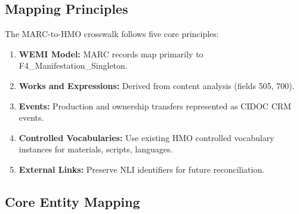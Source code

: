 \documentclass[12pt]{article}
\begin{document}
\subsection{Mapping Principles}

The MARC-to-HMO crosswalk follows five core principles:

\begin{enumerate}
\item \textbf{WEMI Model:} MARC records map primarily to F4\_Manifestation\_Singleton.
\item \textbf{Works and Expressions:} Derived from content analysis (fields 505, 700).
\item \textbf{Events:} Production and ownership transfers represented as CIDOC CRM events.
\item \textbf{Controlled Vocabularies:} Use existing HMO controlled vocabulary instances for materials, scripts, languages.
\item \textbf{External Links:} Preserve NLI identifiers for future reconciliation.
\end{enumerate}

\subsection{Core Entity Mapping}
\end{document}
